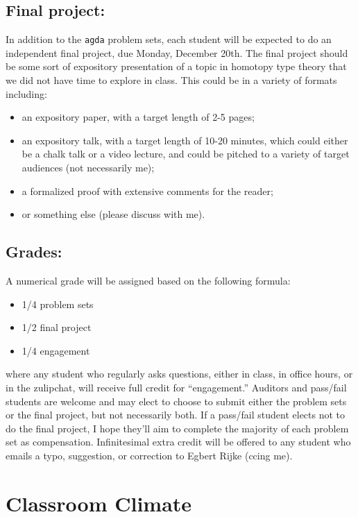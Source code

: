 \documentclass{amsart}
\theoremstyle{definition}
\theoremstyle{remark}
\numberwithin{equation}{section}
\begin{document}
\subsection*{Final project:}
In addition to the \texttt{agda} problem sets, each student will be expected to do an independent final project, due Monday, December 20th. The final project should be some sort of expository presentation of a topic in homotopy type theory that we did not have time to explore in class. This could be in a variety of formats including:
\begin{itemize}
\item an expository paper, with a target length of 2-5 pages;
\item an expository talk, with a target length of 10-20 minutes, which could either be a chalk talk or a video lecture, and could be pitched to a variety of target audiences (not necessarily me);
\item a formalized proof with extensive comments for the reader;
\item or something else (please discuss with me).
\end{itemize}

\subsection*{Grades:}
A numerical grade will be assigned based on the following formula:
\begin{itemize}
\item 1/4 problem sets
\item 1/2 final project
\item 1/4 engagement
\end{itemize}
where any student who regularly asks questions, either in class, in office hours, or in the zulipchat, will receive full credit for ``engagement.'' Auditors and pass/fail students are welcome and may elect to choose to submit either the problem sets or the final project, but not necessarily both. If a pass/fail student elects not to do the final project, I hope they'll aim to complete the majority of each problem set as compensation. Infinitesimal extra credit will be offered to any student who emails a typo, suggestion, or correction to Egbert Rijke (ccing me).


\section*{Classroom Climate}
\end{document}
